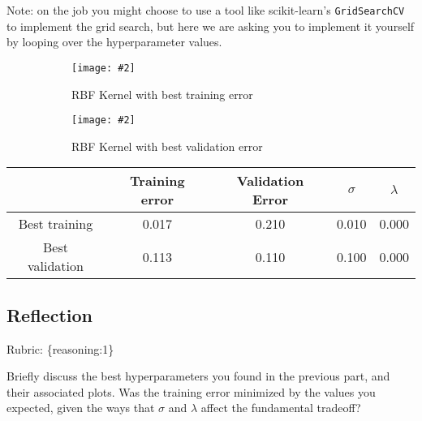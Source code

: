 \documentclass{article}
\def\rubric#1{\gre{Rubric: \{#1\}}}{}
\def\gre#1{{\color{gre}#1}}
\def\ans#1{{\color{ans}#1}}
\newcommand{\centerfig}[2]{\begin{center}\texttt{[image: \#2]}\end{center}}
\begin{document}
Note: on the job you might choose to use a tool like scikit-learn's \texttt{GridSearchCV} to implement the grid search, but here we are asking you to implement it yourself by looping over the hyperparameter values.

\ans{
    \begin{figure}[htp]
        \begin{subfigure}[b]{0.5\textwidth} \color{ans}
            \centerfig{1.0}{../figs/logRegRBFKernel_MaxTrain.png}
            {
              \begin{center}
                 RBF Kernel with best training error
              \end{center}
            }
          \label{fig:1}
        \end{subfigure}
        \begin{subfigure}[b]{0.5\textwidth} \color{ans}
            \centerfig{1.0}{../figs/logRegRBFKernel_MaxValidation.png}
           {
               \begin{center}
                RBF Kernel with best validation error
               \end{center}
           }
          \label{fig:2}
        \end{subfigure}
    \end{figure}
    \scriptsize
    \setlength{\tabcolsep}{2pt}
    \begin{center}
    \begin{tabular}{SSSSS} \toprule
       {} & {Training error} & {Validation Error} & {$\sigma$} & {$\lambda$} \\ \midrule
       {Best training} & 0.017 & 0.210 & 0.010 & 0.000 \\ \midrule
       {Best validation} & 0.113 & 0.110 & 0.100 & 0.000 \\ \bottomrule
    \end{tabular}
    \end{center}
    \normalsize
}


\subsection{Reflection}
\rubric{reasoning:1}

Briefly discuss the best hyperparameters you found in the previous part, and their associated plots. Was the training error minimized by the values you expected, given the ways that $\sigma$ and $\lambda$ affect the fundamental tradeoff?

\ans{
}
\end{document}
